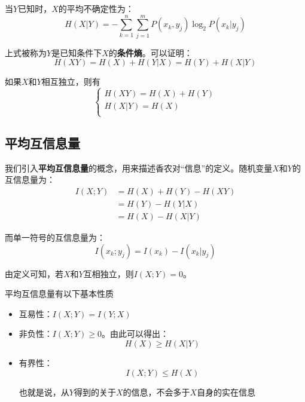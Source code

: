 \documentclass[UTF8,a4paper,11pt]{article}
\begin{document}
当$Y$已知时，$X$的平均不确定性为：
\begin{equation}
H(X|Y)=-\sum_{k=1}^n\sum_{j=1}^mP(x_k,y_j)\log_{2}{P(x_k|y_j)}
\end{equation}

上式被称为$Y$是已知条件下$X$的\textbf{条件熵}。可以证明：
\begin{equation}
H(XY)=H(X)+H(Y|X)=H(Y)+H(X|Y)
\end{equation}

如果$X$和$Y$相互独立，则有
\begin{equation}
\begin{cases}
H(XY)=H(X)+H(Y) \\
H(X|Y)=H(X) \\
\end{cases}
\end{equation}

\subsection{平均互信息量}
我们引入\textbf{平均互信息量}的概念，用来描述香农对“信息”的定义。随机变量$X$和$Y$的互信息量为：
\begin{equation}
\begin{aligned}
I(X;Y)&=H(X)+H(Y)-H(XY) \\
&=H(Y)-H(Y|X) \\
&=H(X)-H(X|Y)
\end{aligned}
\end{equation}

而单一符号的互信息量为：
\begin{equation}
I(x_k;y_j)=I(x_k)-I(x_k|y_j)
\end{equation}

由定义可知，若$X$和$Y$互相独立，则$I(X;Y)=0$。

平均互信息量有以下基本性质
\begin{itemize}
\item 互易性：$I(X;Y)=I(Y;X)$
\item 非负性：$I(X;Y)\ge 0$。由此可以得出：
\begin{equation}
H(X)\ge H(X|Y)
\end{equation}

\item 有界性：
\begin{equation}
I(X;Y)\le H(X)
\end{equation}

也就是说，从$Y$得到的关于$X$的信息，不会多于$X$自身的实在信息
\end{itemize}
\end{document}
